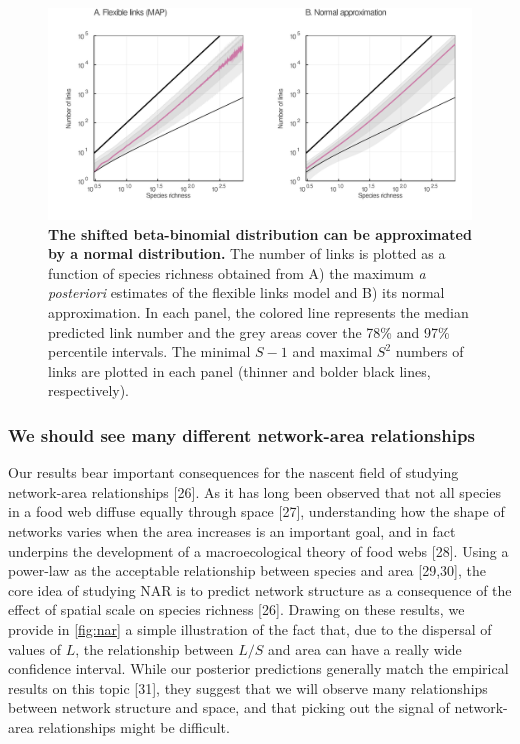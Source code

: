 \documentclass[12pt]{article}
\begin{document}
\begin{figure}
\hypertarget{fig:MAPnormal}{%
\centering
\includegraphics{figures/betabinmap_normal_links.png}
\caption{\textbf{The shifted beta-binomial distribution can be
approximated by a normal distribution.} The number of links is plotted
as a function of species richness obtained from A) the maximum \emph{a
posteriori} estimates of the flexible links model and B) its normal
approximation. In each panel, the colored line represents the median
predicted link number and the grey areas cover the 78\% and 97\%
percentile intervals. The minimal \(S-1\) and maximal \(S^2\) numbers of
links are plotted in each panel (thinner and bolder black lines,
respectively).}\label{fig:MAPnormal}
}
\end{figure}

\hypertarget{we-should-see-many-different-network-area-relationships}{%
\subsubsection{We should see many different network-area
relationships}\label{we-should-see-many-different-network-area-relationships}}

Our results bear important consequences for the nascent field of
studying network-area relationships {[}26{]}. As it has long been
observed that not all species in a food web diffuse equally through
space {[}27{]}, understanding how the shape of networks varies when the
area increases is an important goal, and in fact underpins the
development of a macroecological theory of food webs {[}28{]}. Using a
power-law as the acceptable relationship between species and area
{[}29,30{]}, the core idea of studying NAR is to predict network
structure as a consequence of the effect of spatial scale on species
richness {[}26{]}. Drawing on these results, we provide in
\cref{fig:nar} a simple illustration of the fact that, due to the
dispersal of values of \(L\), the relationship between \(L/S\) and area
can have a really wide confidence interval. While our posterior
predictions generally match the empirical results on this topic
{[}31{]}, they suggest that we will observe many relationships between
network structure and space, and that picking out the signal of
network-area relationships might be difficult.
\end{document}

